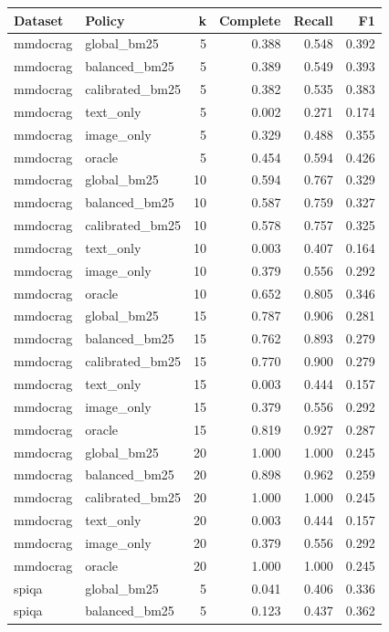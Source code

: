 \begin{tabular}{llrrrr}
\toprule
Dataset & Policy & k & Complete & Recall & F1 \\
\midrule
mmdocrag & global\_bm25 & 5 & 0.388 & 0.548 & 0.392 \\
mmdocrag & balanced\_bm25 & 5 & 0.389 & 0.549 & 0.393 \\
mmdocrag & calibrated\_bm25 & 5 & 0.382 & 0.535 & 0.383 \\
mmdocrag & text\_only & 5 & 0.002 & 0.271 & 0.174 \\
mmdocrag & image\_only & 5 & 0.329 & 0.488 & 0.355 \\
mmdocrag & oracle & 5 & 0.454 & 0.594 & 0.426 \\
mmdocrag & global\_bm25 & 10 & 0.594 & 0.767 & 0.329 \\
mmdocrag & balanced\_bm25 & 10 & 0.587 & 0.759 & 0.327 \\
mmdocrag & calibrated\_bm25 & 10 & 0.578 & 0.757 & 0.325 \\
mmdocrag & text\_only & 10 & 0.003 & 0.407 & 0.164 \\
mmdocrag & image\_only & 10 & 0.379 & 0.556 & 0.292 \\
mmdocrag & oracle & 10 & 0.652 & 0.805 & 0.346 \\
mmdocrag & global\_bm25 & 15 & 0.787 & 0.906 & 0.281 \\
mmdocrag & balanced\_bm25 & 15 & 0.762 & 0.893 & 0.279 \\
mmdocrag & calibrated\_bm25 & 15 & 0.770 & 0.900 & 0.279 \\
mmdocrag & text\_only & 15 & 0.003 & 0.444 & 0.157 \\
mmdocrag & image\_only & 15 & 0.379 & 0.556 & 0.292 \\
mmdocrag & oracle & 15 & 0.819 & 0.927 & 0.287 \\
mmdocrag & global\_bm25 & 20 & 1.000 & 1.000 & 0.245 \\
mmdocrag & balanced\_bm25 & 20 & 0.898 & 0.962 & 0.259 \\
mmdocrag & calibrated\_bm25 & 20 & 1.000 & 1.000 & 0.245 \\
mmdocrag & text\_only & 20 & 0.003 & 0.444 & 0.157 \\
mmdocrag & image\_only & 20 & 0.379 & 0.556 & 0.292 \\
mmdocrag & oracle & 20 & 1.000 & 1.000 & 0.245 \\
spiqa & global\_bm25 & 5 & 0.041 & 0.406 & 0.336 \\
spiqa & balanced\_bm25 & 5 & 0.123 & 0.437 & 0.362 \\

\end{tabular}
